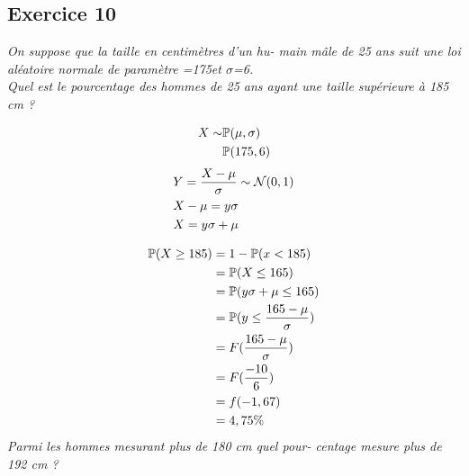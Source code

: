 \subsection*{Exercice 10 }
\textit{On suppose que la taille en centimètres d’un hu- main mâle de 25 ans suit une loi aléatoire normale de paramètre \textmu{}=175et $\sigma$=6.\\
Quel est le pourcentage des hommes de 25 ans ayant une taille supérieure à 185 cm ?}
\\
\begin{multicols}{2}
\begin{align*}
    X \sim &\mathbb{P}(\mu,\sigma)\\
    &\mathbb{P}(175, 6)
\end{align*}
\begin{align*}
    &Y = \frac{X - \mu}{\sigma} \sim \mathcal{N}(0,1)\\
    &X - \mu = y\sigma
    \\&X =  y\sigma + \mu
\end{align*}
\end{multicols}
\begin{align*}
    \mathbb{P}(X \geq 185) &= 1 - \mathbb{P}(x < 185)\\
    &= \mathbb{P}(X \leq 165)\\
    &=\mathbb{P}(y\sigma + \mu \leq 165)\\
    &=\mathbb{P}(y\leq \frac{165 - \mu}{\sigma})\\
    &= F(\frac{165 -  \mu}{\sigma})\\
    &= F( \frac{-10}{6})\\
    &= f(-1,67)\\
    &= 4,75 \%
\end{align*}
\textit{Parmi les hommes mesurant plus de 180 cm quel pour- centage mesure plus de 192 cm ?}\\
